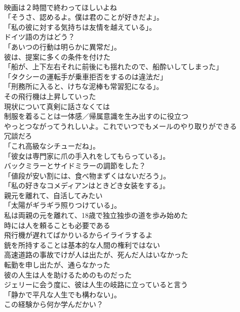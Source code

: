 \documentclass[8pt]{extreport}
\begin{document}
\begin{CJK}{UTF8}{min}
\\	映画は２時間で終わってほしいよね	
\\	「そうさ、認めるよ。僕は君のことが好きだよ」。	
\\	「私の彼に対する気持ちは友情を越えている」。	
\\	ドイツ語の方はどう？	
\\	「あいつの行動は明らかに異常だ」。	
\\	彼は、提案に多くの条件を付けた	
\\	「船が、上下左右それに前後にも揺れたので、船酔いしてしまった」	
\\	「タクシーの運転手が乗車拒否をするのは違法だ」	
\\	「刑務所に入ると、けちな泥棒も常習犯になる」。	
\\	その飛行機は上昇していった	
\\	現状について真剣に話さなくては	
\\	制服を着ることは一体感／帰属意識を生み出すのに役立つ	
\\	やっとつながってうれしいよ。これでいつでもメールのやり取りができる	
\\	冗談だろ	
\\	「これ高級なシチューだね」。	
\\	「彼女は専門家に爪の手入れをしてもらっている」。	
\\	バックミラーとサイドミラーの調節をした？	
\\	「値段が安い割には、食べ物まずくはないだろう」。	
\\	「私の好きなコメディアンはときどき女装をする」。	
\\	親元を離れて、自活してみたい	
\\	「太陽がギラギラ照りつけている」。	
\\	私は両親の元を離れて、18歳で独立独歩の道を歩み始めた	
\\	時には人を頼ることも必要である	
\\	飛行機が遅れてばかりいるからイライラするよ	
\\	銃を所持することは基本的な人間の権利ではない	
\\	高速道路の事故でけが人は出たが、死んだ人はいなかった	
\\	転勤を申し出たが、通らなかった	
\\	彼の人生は人を助けるためのものだった	
\\	ジェリーに会う度に、彼は人生の岐路に立っていると言う	
\\	「静かで平凡な人生でも構わない」。	
\\	この経験から何か学んだかい？	

\end{CJK}
\end{document}
